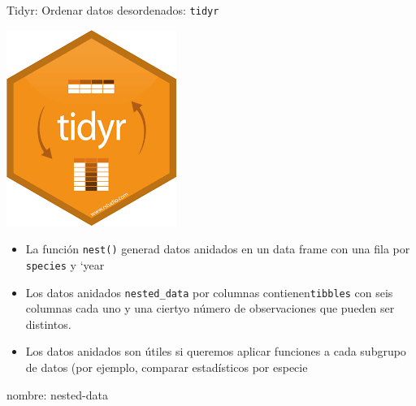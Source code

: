 \documentclass[
  ignorenonframetext,
  aspectratio=169]{beamer}
\providecommand{\tightlist}{%
  \setlength{\itemsep}{0pt}\setlength{\parskip}{0pt}}
\begin{document}
\begin{frame}[fragile]{Tidyr: Ordenar datos desordenados:
\texttt{tidyr}}
\label{tidyr-ordenar-datos-desordenados-tidyr-5}
\begin{flushright}\includegraphics[width=0.05\linewidth]{Imgs/logo_tidyr} \end{flushright}

\begin{itemize}
\tightlist
\item
  La función \texttt{nest()} generad datos anidados en un data frame con
  una fila por \texttt{species} y `year
\item
  Los datos anidados \texttt{nested\_data} por columnas
  contienen\texttt{tibbles} con seis columnas cada uno y una ciertyo
  número de observaciones que pueden ser distintos.
\item
  Los datos anidados son útiles si queremos aplicar funciones a cada
  subgrupo de datos (por ejemplo, comparar estadísticos por especie
\end{itemize}

nombre: nested-data
\end{frame}
\end{document}
